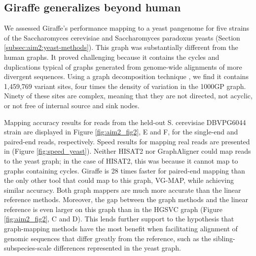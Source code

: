 \documentclass[11pt]{ucscthesis}
\begin{document}
\subsection{Giraffe generalizes beyond human}
We assessed Giraffe’s performance mapping to a yeast pangenome for five strains of the Saccharomyces cerevisiae and Saccharomyces paradoxus yeasts (Section \ref{subsec:aim2:yeast-methods}).
This graph was substantially different from the human graphs.
It proved challenging because it contains the cycles and duplications typical of graphs generated from genome-wide alignments of more divergent sequences.
Using a graph decomposition technique \cite{paten_superbubbles_2018}, we find it contains 1,459,769 variant sites, four times the density of variation in the 1000GP graph.
Ninety of these sites are complex, meaning that they are not directed, not acyclic, or not free of internal source and sink nodes.

Mapping accuracy results for reads from the held-out S. cerevisiae DBVPG6044 strain are displayed in Figure \ref{fig:aim2_fig2}, E and F, for the single-end and paired-end reads, respectively.
Speed results for mapping real reads are presented in (Figure \ref{fig:speed_yeast}).
Neither HISAT2 nor GraphAligner could map reads to the yeast graph; in the case of HISAT2, this was because it cannot map to graphs containing cycles.
Giraffe is 28 times faster for paired-end mapping than the only other tool that could map to this graph, VG-MAP, while achieving similar accuracy.
Both graph mappers are much more accurate than the linear reference methods.
Moreover, the gap between the graph methods and the linear reference is even larger on this graph than in the HGSVC graph (Figure \ref{fig:aim2_fig2}, C and D).
This lends further support to the hypothesis that graph-mapping methods have the most benefit when facilitating alignment of genomic sequences that differ greatly from the reference, such as the sibling-subspecies-scale differences represented in the yeast graph.
\end{document}
